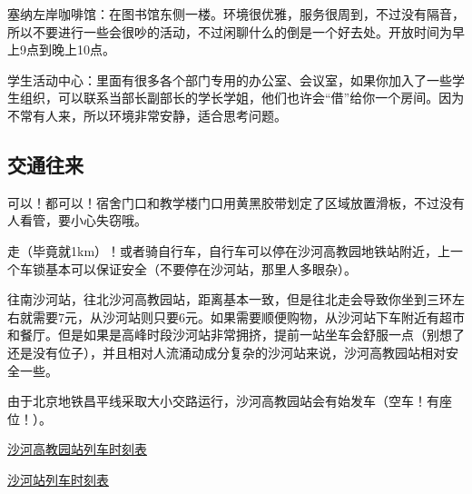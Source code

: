 塞纳左岸咖啡馆：在图书馆东侧一楼。环境很优雅，服务很周到，不过没有隔音，所以不要进行一些会很吵的活动，不过闲聊什么的倒是一个好去处。开放时间为早上9点到晚上10点。

学生活动中心：里面有很多各个部门专用的办公室、会议室，如果你加入了一些学生组织，可以联系当部长副部长的学长学姐，他们也许会“借”给你一个房间。因为不常有人来，所以环境非常安静，适合思考问题。

\subsection{交通往来}


可以！都可以！宿舍门口和教学楼门口用黄黑胶带划定了区域放置滑板，不过没有人看管，要小心失窃哦。


走（毕竟就1km）！或者骑自行车，自行车可以停在沙河高教园地铁站附近，上一个车锁基本可以保证安全（不要停在沙河站，那里人多眼杂）。


往南沙河站，往北沙河高教园站，距离基本一致，但是往北走会导致你坐到三环左右就需要7元，从沙河站则只要6元。如果需要顺便购物，从沙河站下车附近有超市和餐厅。但是如果是高峰时段沙河站非常拥挤，提前一站坐车会舒服一点（别想了还是没有位子），并且相对人流涌动成分复杂的沙河站来说，沙河高教园站相对安全一些。

由于北京地铁昌平线采取大小交路运行，沙河高教园站会有始发车（空车！有座位！）。

\href{https://www.bjsubway.com/station/xltcx/linecp/2013-08-26/246.html?sk=1}{沙河高教园站列车时刻表}

\href{https://www.bjsubway.com/station/xltcx/linecp/2013-08-26/249.html?sk=1}{沙河站列车时刻表}
